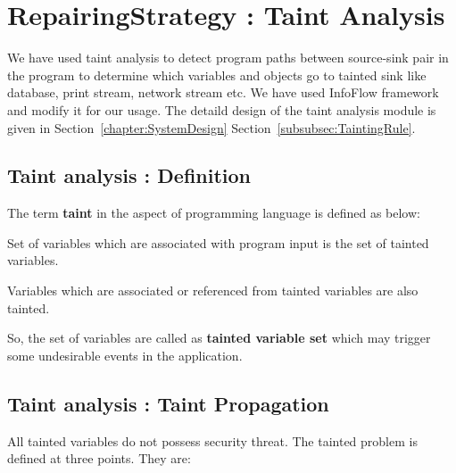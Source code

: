 
\section{RepairingStrategy : Taint Analysis}
\label{sec:taintAnalysis}

We have used taint analysis to detect program paths between source-sink pair in
the program to determine which variables and objects go to tainted sink like
database, print stream, network stream etc. We have used InfoFlow framework and
modify it for our usage. The detaild design of the taint analysis module is
given in Section~\ref{chapter:SystemDesign}
Section~\ref{subsubsec:TaintingRule}. 

\subsection{Taint analysis : Definition}
\label{subsec:TaintAnalysisDef}

The term \textbf{taint} in the aspect of programming language is defined as
below:
\begin{definition}
Set of variables which are associated with program input is the set of tainted
variables.
\end{definition}
\begin{definition}
Variables which are associated or referenced from tainted variables are also
tainted.
\end{definition}
So, the set of variables are called as \textbf{tainted variable set} which may
trigger some undesirable events in the application.

\subsection{Taint analysis : Taint Propagation}
\label{subsec:TaintPropagation}

All tainted variables do not possess security threat. The tainted problem is
defined at three points. They are:

